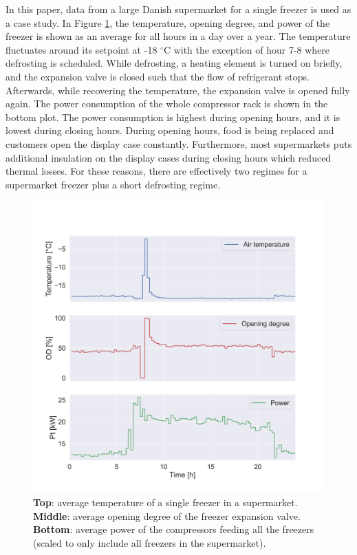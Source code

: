 In this paper, data from a large Danish supermarket for a single freezer is used as a case study. In Figure \ref{fig:chunk}, the temperature, opening degree, and power of the freezer is shown as an average for all hours in a day over a year. The temperature fluctuates around its setpoint at -18 $^{\circ}$C with the exception of hour 7-8 where defrosting is scheduled. While defrosting, a heating element is turned on briefly, and the expansion valve is closed such that the flow of refrigerant stops. Afterwards, while recovering the temperature, the expansion valve is opened fully again. The power consumption of the whole compressor rack is shown in the bottom plot. The power consumption is highest during opening hours, and it is lowest during closing hours. During opening hours, food is being replaced and customers open the display case constantly. Furthermore, most supermarkets puts additional insulation on the display cases during closing hours which reduced thermal losses. For these reasons, there are effectively two regimes for a supermarket freezer plus a short defrosting regime.

\begin{figure}[!t]
    \centering
    \includegraphics[width=\columnwidth]{../figures/tmp_od_Pt.png}
    \caption{\textbf{Top}: average temperature of a single freezer in a supermarket. \textbf{Middle}: average opening degree of the freezer expansion valve. \textbf{Bottom}: average power of the compressors feeding all the freezers (scaled to only include all freezers in the supermarket).}
    \label{fig:chunk}
\end{figure}

